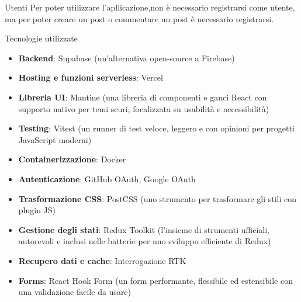 \documentclass[8pt]{beamer}
\begin{document}
\begin{frame}{Utenti}
    Per poter utilizzare l'apllicazione,non è necessario registrarsi come utente, ma per poter creare un post o commentare un post è necessario registrarsi.
    \begin{itemize}
    \end{itemize}
\end{frame}

\begin{frame}{Tecnologie utilizzate}
    \begin{itemize}
        \item \textbf{Backend}: Supabase (un'alternativa open-source a Firebase)
        \item \textbf{Hosting e funzioni serverless}: Vercel
        \item \textbf{Libreria UI}: Mantine (una libreria di componenti e ganci React con supporto nativo per temi scuri, focalizzata su usabilità e accessibilità)
        \item \textbf{Testing}: Vitest (un runner di test veloce, leggero e con opinioni per progetti JavaScript moderni)
        \item \textbf{Containerizzazione}: Docker
        \item \textbf{Autenticazione}: GitHub OAuth, Google OAuth
        \item \textbf{Trasformazione CSS}: PostCSS (uno strumento per trasformare gli stili con plugin JS)
        \item \textbf{Gestione degli stati}: Redux Toolkit (l'insieme di strumenti ufficiali, autorevoli e inclusi nelle batterie per uno sviluppo efficiente di Redux)
        \item \textbf{Recupero dati e cache}: Interrogazione RTK
        \item \textbf{Forms}: React Hook Form (un form performante, flessibile ed estensibile con una validazione facile da usare)
    \end{itemize}
\end{frame}
\end{document}

